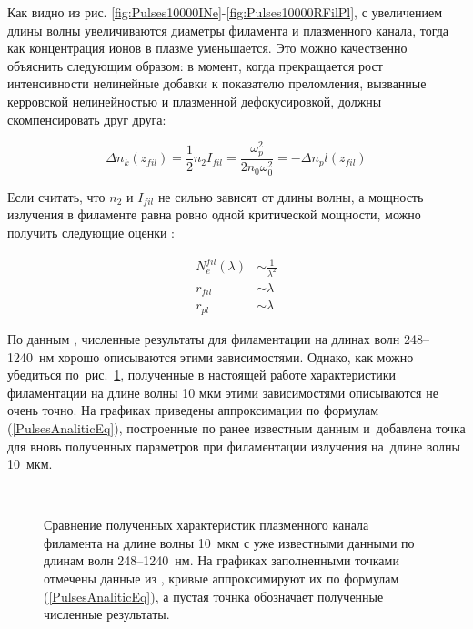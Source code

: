 
Как видно из рис. \ref{fig:Pulses10000INe}-\ref{fig:Pulses10000RFilPl}, с увеличением длины волны увеличиваются диаметры филамента
и плазменного канала, тогда как концентрация ионов в плазме уменьшается. Это можно качественно объяснить следующим образом: в момент, когда прекращается рост интенсивности
нелинейные добавки к показателю преломления, вызванные керровской нелинейностью и плазменной дефокусировкой, должны скомпенсировать друг друга:

\begin{equation}
\Delta n_k(z_{fil}) = \frac{1}{2}n_2 I_{fil} = \frac{\omega_p^2}{2 n_0 \omega_0^2} = -\Delta n_pl(z_{fil})
\end{equation}

Если считать, что $n_2$ и $I_{fil}$ не сильно зависят от длины волны, а мощность излучения в филаменте равна ровно одной критической мощности,
можно получить следующие оценки \cite{FedorovKandidovDifferentWavelengths2008}:

\begin{align}\label{PulsesAnaliticEq}
N_e^{fil}(\lambda) & \sim \frac{1}{\lambda^2} \\
r_{fil} & \sim \lambda \\
r_{pl} & \sim \lambda
\end{align}

По данным \cite{FedorovKandidovDifferentWavelengths2008}, численные результаты для филаментации на длинах волн 248--1240~нм хорошо описываются этими зависимостями.
Однако, как можно убедиться по~рис.~\ref{fig:PulsesAnalitic}, полученные в настоящей работе характеристики филаментации на длине волны 10 мкм этими зависимостями описываются
не очень точно. На графиках приведены аппроксимации по формулам (\ref{PulsesAnaliticEq}),
построенные по ранее известным данным \cite{FedorovPhD2010} и~добавлена точка для вновь полученных параметров
при филаментации излучения на~длине волны 10~мкм.


\begin{figure}[H]
    \begin{center}
        \begin{minipage}{\minipagewidthtwo}
        \end{minipage}
        \hfill
        \begin{minipage}{\minipagewidthtwo}
        \end{minipage}
        \\[1ex]
        \caption{Сравнение полученных характеристик плазменного канала филамента на длине волны 10~мкм с уже известными данными по длинам волн 248--1240~нм.
                 На графиках заполненными точками отмечены данные из \cite{FedorovPhD2010}, кривые аппроксимируют их по формулам (\ref{PulsesAnaliticEq}), а пустая точнка обозначает полученные численные результаты.}
        \label{fig:PulsesAnalitic}
    \end{center}
\end{figure}

